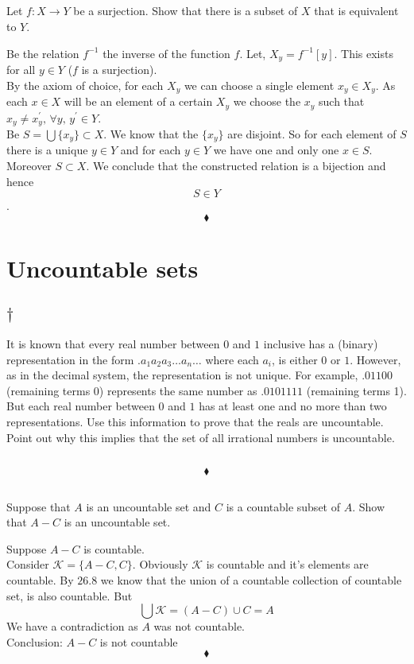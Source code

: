 \subsection{}
\begin{tcolorbox}
Let $f: X \rightarrow Y$ be a surjection. Show that there is a subset of $X$ that is equivalent to $Y$. 
\end{tcolorbox}
$$ $$
Be the relation $f^{-1}$ the inverse of the function $f$. Let, $X_y=f^{-1}[y]$. This exists for all $y\in Y$ ($f$ is a surjection).\\
By the axiom of choice, for each $X_y$ we can choose a single element  $x_y\in X_y$. As each $x\in X$ will be an element of a certain $X_y$ we choose the $x_y$ such that $x_y\ne x_y^{'},\, \forall y,\, y^{'}\in Y$.\\
Be $S=\bigcup\{x_y\}\subset X$. We know that the $\{x_y\}$ are disjoint. So for each element of $S$ there is a unique $y\in Y$ and for each $y\in Y$ we have one and only one $x\in S$. Moreover $S\subset X$. We conclude that the constructed relation is a bijection and hence
$$S\in Y$$.
$$\blacklozenge$$


\newpage

 \section{Uncountable sets}
\subsection{$\dagger$}
\begin{tcolorbox}
It is known that every real number between $0$ and $1$ inclusive has a (binary) representation in the form $.a_1 a_2 a_3 \dots a_n\dots$ where each $a_i$, is either $0$ or $1$. However, as in the decimal system, the representation is not unique. For example, $.01100$ (remaining terms 0) represents the same number as $.0101111$ (remaining terms 1). But each real number between $0$ and $1$ has at least one and no more than two representations. Use this information to prove that the reals are uncountable. Point out why this implies that the set of all irrational numbers is uncountable. 
\end{tcolorbox}
$$ $$

$$\blacklozenge$$

\subsection{}
\begin{tcolorbox}
Suppose that $A$ is an uncountable set and $C$ is a countable subset of $A$. Show that $A- C$ is an uncountable set. 

\end{tcolorbox}
$$ $$
Suppose $A-C$ is countable. \\
Consider $\mathscr{K}=\{A-C,C\}$. Obviously $\mathscr{K}$ is countable and it's elements are countable. By $\mathbf{26.8}$ we know that the union of a countable collection of countable set, is also countable. But $$\bigcup \mathscr{K}= (A-C)\cup C= A$$
We have a contradiction as $A$ was not countable.
\\
Conclusion:  $A-C$ is not countable
$$\blacklozenge$$

